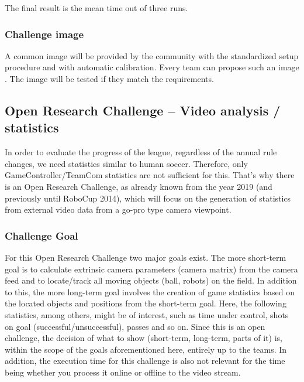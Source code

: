         The final result is the mean time out of three runs.

    \subsubsection{Challenge image}
        \label{sec:Challenge_image}
        A common image will be provided by the community with the standardized setup procedure and with automatic calibration. Every team can propose such an image . The image will be tested if they match the requirements.

\subsection{Open Research Challenge -- Video analysis / statistics}
In order to evaluate the progress of the league, regardless of the annual rule changes, we need statistics similar to human soccer. Therefore, only GameController/TeamCom statistics are not sufficient for this. That's why there is an Open Research Challenge, as already known from the year 2019 (and previously until RoboCup 2014), which will focus on the generation of statistics from external video data from a go-pro type camera viewpoint.

    \subsubsection{Challenge Goal}
    For this Open Research Challenge two major goals exist. The more short-term goal is to calculate extrinsic camera parameters (camera matrix) from the camera feed and to locate/track all moving objects (ball, robots) on the field. In addition to this, the more long-term goal involves the creation of game statistics based on the located objects and positions from the short-term goal. Here, the following statistics, among others, might be of interest, such as time under control, shots on goal (successful/unsuccessful), passes and so on. Since this is an open challenge, the decision of what to show (short-term, long-term, parts of it) is, within the scope of the goals aforementioned here, entirely up to the teams. In addition, the execution time for this challenge is also not relevant for the time being whether you process it online or offline to the video stream.

